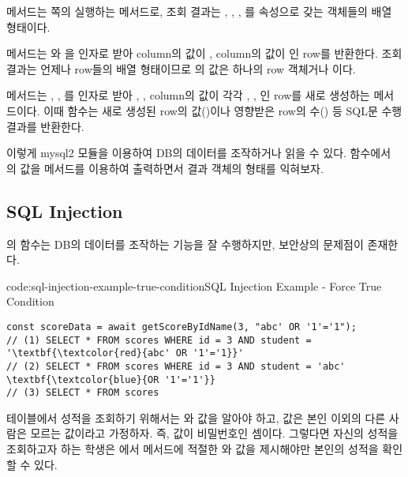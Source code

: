  메서드는 \pageref{shell:group-by-example}쪽의 \을 실행하는 메서드로, 조회 결과는 , , , 를 속성으로 갖는 객체들의 배열 형태이다.

 메서드는 와 을 인자로 받아  column의 값이 ,  column의 값이 인 row를 반환한다. 조회 결과는 언제나 row들의 배열 형태이므로 의 값은 하나의 row 객체거나 이다.

 메서드는 , , 를 인자로 받아 , ,  column의 값이 각각 , , 인 row를 새로 생성하는 메서드이다. 이때  함수는 새로 생성된 row의  값()이나 영향받은 row의 수() 등 SQL문 수행 결과를 반환한다.

이렇게 mysql2 모듈을 이용하여 DB의 데이터를 조작하거나 읽을 수 있다.  함수에서 의 값을  메서드를 이용하여 출력하면서 결과 객체의 형태를 익혀보자.

\subsection*{SQL Injection}

의  함수는 DB의 데이터를 조작하는 기능을 잘 수행하지만, 보안상의 문제점이 존재한다.

\begin{codeenv}{code:sql-injection-example-true-condition}{SQL Injection Example - Force True Condition}
\begin{Verbatim}[commandchars=\\\{\}]
const scoreData = await getScoreByIdName(3, "abc' OR '1'='1");
// (1) SELECT * FROM scores WHERE id = 3 AND student = '\textbf{\textcolor{red}{abc' OR '1'='1}}'
// (2) SELECT * FROM scores WHERE id = 3 AND student = 'abc' \textbf{\textcolor{blue}{OR '1'='1'}}
// (3) SELECT * FROM scores
\end{Verbatim}
\end{codeenv}

 테이블에서 성적을 조회하기 위해서는 와  값을 알아야 하고,  값은 본인 이외의 다른 사람은 모르는 값이라고 가정하자. 즉,  값이 비밀번호인 셈이다. 그렇다면 자신의 성적을 조회하고자 하는 학생은 에서  메서드에 적절한 와  값을 제시해야만 본인의 성적을 확인할 수 있다.

